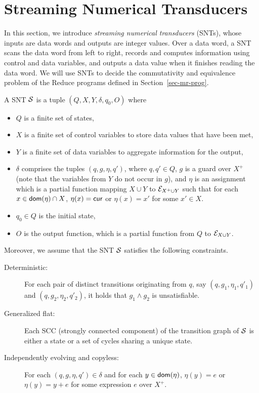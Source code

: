 


\section{Streaming Numerical Transducers}\label{sec-def-snt}

In this section, we introduce \emph{streaming numerical transducers} (SNTs), whose inputs are data words and outputs are integer values. Over a data word, a SNT scans the data word from left to right, records and computes information using control and data variables, and outputs a data value when it finishes reading the data word. We will use SNTs to decide the commutativity and equivalence problem of the Reduce programs defined in Section~\ref{sec-mr-prog}.


A SNT ${\mathcal{S} }$ is a tuple $(Q, X, Y, \delta, q_0, O)$ where 
\begin{itemize}
\item $Q$ is a finite set of states,
%
\item $X$ is a finite set of control variables to store data values that have been met,
%
\item $Y$ is a finite set of data variables to aggregate information for the output,
%
\item $\delta$ comprises the tuples $(q,  g, \eta, q')$, where $q,q'\in Q$, $g$ is a guard over $X^+$ (note that the variables from $Y$ do not occur in $g$), and $\eta$ is an assignment which is a partial function mapping $X \cup Y$  to ${\mathcal{E} }_{X^+ \cup Y}$ such that for each $x \in \mathsf{dom}(\eta) \cap X$, $\eta(x)=\mathsf{cur}$ or $\eta(x) = x'$ for some $x' \in X$.
%
\item $q_0 \in Q$ is the initial state,
%
\item $O$ is the output function, which is a partial function from $Q$ to ${\mathcal{E} }_{X \cup Y}$.%
\end{itemize}
Moreover, we assume that the SNT ${\mathcal{S} }$ satisfies the following constraints.
\begin{description}
\item [Deterministic:] For each pair of distinct transitions originating from $q$, say $(q, g_1, \eta_1,q'_1)$ and $(q, g_2,\eta_2,q'_2)$, it holds that $g_1 \wedge g_2$ is unsatisfiable.
%
\item [Generalized flat:] Each SCC (strongly connected component) of the transition graph of ${\mathcal{S} }$ is either a state or a set of cycles sharing a unique state.
%
%
\item[Independently evolving and copyless:] For each $(q, g, \eta, q') \in \delta$ and for each $y \in \mathsf{dom}(\eta)$, $\eta(y)=e$ or $\eta(y)=y+e$ for some expression $e$ over $X^+$.
%
\end{description}

